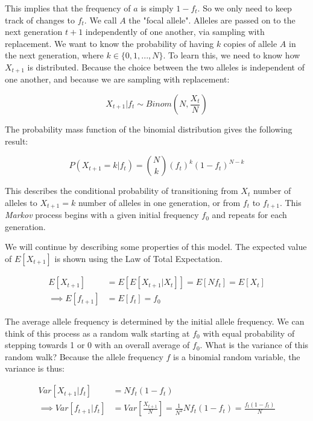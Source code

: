This implies that the frequency of $a$ is simply $1-f_t$. So we only need to keep track of changes to $f_t$. We call $A$ the "focal allele". Alleles are passed on to the next generation $t+1$ independently of one another, via sampling with replacement. We want to know the probability of having $k$ copies of allele $A$ in the next generation, where $k \in \{0,1,...,N\}$. To learn this, we need to know how $X_{t+1}$ is distributed. Because the choice between the two alleles is independent of one another, and because we are sampling with replacement:

\begin{equation}\label{eq:neutral_model}
    X_{t+1} | f_t \sim Binom(N,\frac{X_t}{N})
\end{equation}

 The probability mass function of the binomial distribution gives the following result:

\begin{equation}
    P(X_{t+1} = k | f_t) = {N \choose k}(f_t)^k (1-f_t)^{N-k}
\end{equation}

This describes the conditional probability of transitioning from $X_t$ number of alleles to $X_{t+1} = k$ number of alleles in one generation, or from $f_t$ to $f_{t+1}$. This \textit{Markov} process begins with a given initial frequency $f_0$ and repeats for each generation. 


We will continue by describing some properties of this model. The expected value of $E[X_{t+1}]$ is shown using the Law of Total Expectation.

\begin{equation} \label{eq:ex_drift}
    \begin{split}
            E[X_{t+1}] &= E[E[X_{t+1}|X_{t}]] = E[N f_t] = E[X_t] \\
    \implies E[f_{t+1}] &= E[f_t] = f_0
    \end{split}
\end{equation}


The average allele frequency is determined by the initial allele frequency. We can think of this process as a random walk starting at $f_0$ with equal probability of stepping towards 1 or 0 with an overall average of $f_0$. What is the variance of this random walk? Because the allele frequency $f$ is a binomial random variable, the variance is thus:
 
\begin{equation}
    \begin{split}
            Var[X_{t+1} | f_t] &= N f_t(1-f_t) \\
            \implies Var[f_{t+1} | f_t] &= Var[\frac{X_{t+1}}{N}] =  \frac{1}{N^2} N f_t(1-f_t) = \frac{f_t (1-f_t)}{N} 
    \end{split}
\end{equation}

